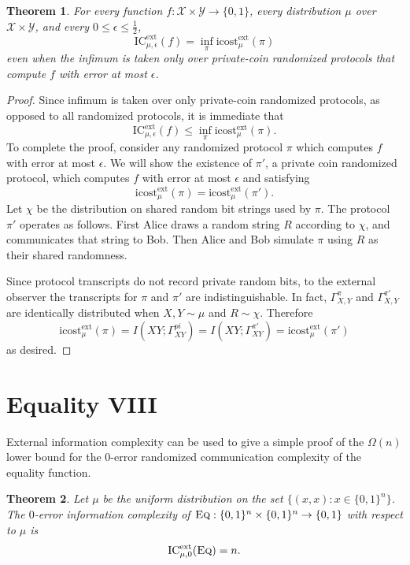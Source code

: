 \documentclass[11pt]{amsart}
\theoremstyle{plain}
\newtheorem{theorem}{Theorem}
\theoremstyle{definition}
\theoremstyle{plain}
\newcommand{\calX}{\mathcal{X}}
\newcommand{\calY}{\mathcal{Y}}
\newcommand{\Eq}{\textsc{Eq}}
\newcommand{\ICext}{\mathrm{IC}^{\mathrm{ext}}}
\newcommand{\icostext}{\mathrm{icost}^{\mathrm{ext}}}
\begin{document}
\begin{theorem}
For every function $f : \calX \times \calY \to \{0,1\}$, every distribution $\mu$ over $\calX \times \calY$, and every $0 \le \epsilon \le \frac12$,
\[
\ICext_{\mu,\epsilon}(f) = \inf_{\pi} \icostext_\mu(\pi)
\]
even when the infimum is taken only over private-coin randomized protocols that compute $f$ with error at most $\epsilon$.
\end{theorem}

\begin{proof}
Since infimum is taken over only private-coin randomized protocols, as opposed to all randomized protocols, it is immediate that
$$\ICext_{\mu,\epsilon}(f) \leq \inf_{\pi} \icostext_\mu(\pi).$$
To complete the proof, consider any randomized protocol $\pi$ which computes $f$ with error at most $\epsilon$. We will show the existence of $\pi'$, a private coin randomized protocol, which computes $f$ with error at most $\epsilon$ and satisfying
$$\icostext_\mu(\pi) = \icostext_\mu(\pi').$$
Let $\chi$ be the distribution on shared random bit strings used by $\pi$. The protocol $\pi'$ operates as follows. First  Alice draws a random string $R$ according to $\chi$, and communicates that string to Bob. Then Alice and Bob simulate $\pi$ using $R$ as their shared randomness.

Since protocol transcripts do not record private random bits, to the external observer the transcripts for $\pi$ and $\pi'$ are indistinguishable. In fact, $\Gamma_{X,Y}^\pi$ and $\Gamma_{X,Y}^{\pi'}$ are identically distributed when $X,Y \sim \mu$ and $R\sim \chi$. Therefore
$$\icostext_\mu(\pi) = I(XY;\Gamma^{pi}_{XY}) = I(XY;\Gamma^{\pi'}_{XY}) = \icostext_\mu(\pi')$$
as desired.
\end{proof}


\newpage 
\section{Equality VIII}

External information complexity can be used to give a simple proof of the $\Omega(n)$ lower bound for the $0$-error randomized communication complexity of the equality function.

\begin{theorem}
Let $\mu$ be the uniform distribution on the set $\{(x,x) : x \in \{0,1\}^n\}$. The $0$-error information complexity of $\Eq : \{0,1\}^n \times \{0,1\}^n \to \{0,1\}$ with respect to $\mu$ is
\[
\ICext_{\mu,0}(\Eq) = n.
\]
\end{theorem}
\end{document}
